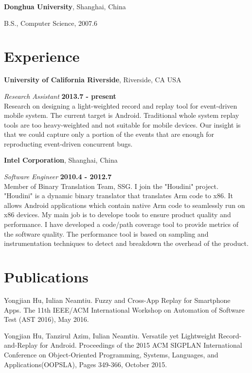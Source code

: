\documentclass[margin,line]{res}
\newenvironment{list1}{
  \begin{list}{\ding{113}}{%
      \setlength{\itemsep}{0in}
      \setlength{\parsep}{0in} \setlength{\parskip}{0in}
      \setlength{\topsep}{0in} \setlength{\partopsep}{0in} 
      \setlength{\leftmargin}{0.17in}}}{\end{list}}
\begin{document}
\begin{resume}
{\bf Donghua University}, Shanghai, China\\
\vspace*{-.1in}
\begin{list1}
\item[] B.S., Computer Science,  2007.6
\end{list1}


\section{\sc Experience}
{\bf University of California Riverside}, Riverside, CA USA

\vspace{-.3cm}
{\em Research Assistant} \hfill {\bf 2013.7 - present}\\
Research on designing a light-weighted record and replay tool for 
event-driven mobile system. The current target is Android. Traditional 
whole system replay tools are too heavy-weighted and not suitable for 
mobile devices. Our insight is that we could capture only a portion 
of the events that are enough for reproducting event-driven concurrent 
bugs.


{\bf Intel Corporation}, Shanghai, China

\vspace{-.3cm}
{\em Software Engineer} \hfill {\bf 2010.4 - 2012.7}\\
Member of Binary Translation Team, SSG. I join the "Houdini" project.
"Houdini" is a dynamic binary translator that translates Arm code to 
x86. It allows Android applications which contain native Arm code to 
seamlessly run on x86 devices. My main job is to develope tools to ensure 
product quality and performance. I have developed a code/path coverage 
tool to provide metrics of the software quality. The performance tool 
is based on sampling and instrumentation techniques to detect and 
breakdown the overhead of the product.


\section{\sc Publications}

Yongjian Hu, Iulian Neamtiu. Fuzzy and Cross-App Replay for Smartphone Apps.
The 11th IEEE/ACM International Workshop on Automation of Software Test (AST 2016), May 2016.

Yongjian Hu, Tanzirul Azim, Iulian Neamtiu. Versatile yet Lightweight Record-and-Replay for Android.
Proceedings of the 2015 ACM SIGPLAN International Conference on Object-Oriented Programming, Systems, Languages, and Applications(OOPSLA),
Pages 349-366, October 2015.


\end{resume}
\end{document}

